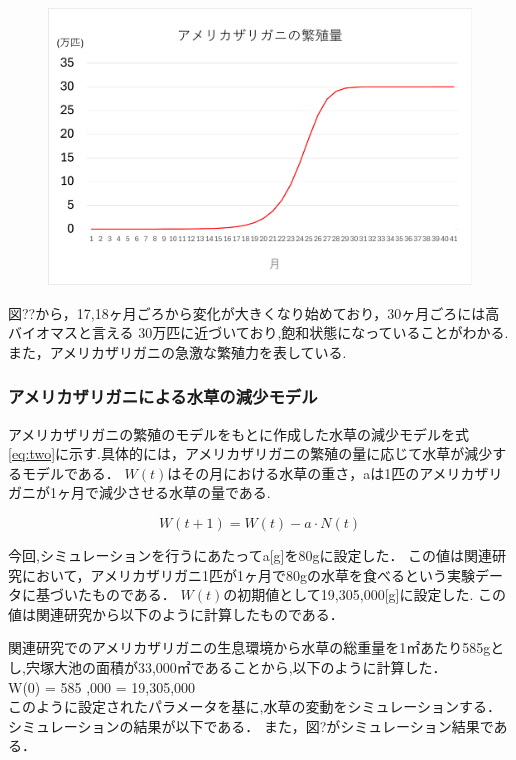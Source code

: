 \documentclass[12pt,a4j,titlepage]{ltjsarticle}
\begin{document}
 {\begin{figure}[h]
 \begin{center}
   \includegraphics[width=.95\columnwidth]{amezari_graph.pdf}
 \end{center}
 \end{figure}

 図??から，17,18ヶ月ごろから変化が大きくなり始めており，30ヶ月ごろには高バイオマスと言える 30万匹に近づいており,飽和状態になっていることがわかる.
また，アメリカザリガニの急激な繁殖力を表している.

\newpage
\subsubsection{アメリカザリガニによる水草の減少モデル}
アメリカザリガニの繁殖のモデルをもとに作成した水草の減少モデルを式\eqref{eq:two}に示す.具体的には，アメリカザリガニの繁殖の量に応じて水草が減少するモデルである．
$W(t)$はその月における水草の重さ，aは1匹のアメリカザリガニが1ヶ月で減少させる水草の量である.

\begin{equation}
  W(t+1) = W(t) - a \cdot N(t)\label{eq:two}
\end{equation}

今回,シミュレーションを行うにあたってa[g]を80gに設定した．
この値は関連研究において，アメリカザリガニ1匹が1ヶ月で80gの水草を食べるという実験データに基づいたものである．
$W(t)$の初期値として19,305,000[g]に設定した.
この値は関連研究から以下のように計算したものである．

関連研究でのアメリカザリガニの生息環境から水草の総重量を1㎡あたり585gとし,宍塚大池の面積が33,000㎡であることから,以下のように計算した．\\
W(0) = 585 ,000 = 19,305,000 \, \\
このように設定されたパラメータを基に,水草の変動をシミュレーションする．
シミュレーションの結果が以下である．
また，図?がシミュレーション結果である．

}
\end{document}
